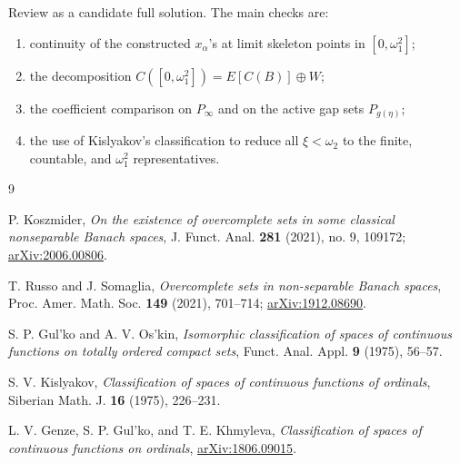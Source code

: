 \documentclass[11pt]{article}
\begin{document}
Review as a candidate full solution.  The main checks are:
\begin{enumerate}[leftmargin=2em]
\item continuity of the constructed \(x_\alpha\)'s at limit skeleton points in
      \([0,\omega_1^2]\);
\item the decomposition \(C([0,\omega_1^2])=E[C(B)]\oplus W\);
\item the coefficient comparison on \(P_\infty\) and on the active gap sets
      \(P_{g(\eta)}\);
\item the use of Kislyakov's classification to reduce all
      \(\xi<\omega_2\) to the finite, countable, and \(\omega_1^2\)
      representatives.
\end{enumerate}

\begin{thebibliography}{9}

P. Koszmider,
\emph{On the existence of overcomplete sets in some classical nonseparable
Banach spaces},
J. Funct. Anal. \textbf{281} (2021), no. 9, 109172;
\href{https://arxiv.org/abs/2006.00806}{arXiv:2006.00806}.

T. Russo and J. Somaglia,
\emph{Overcomplete sets in non-separable Banach spaces},
Proc. Amer. Math. Soc. \textbf{149} (2021), 701--714;
\href{https://arxiv.org/abs/1912.08690}{arXiv:1912.08690}.

S. P. Gul'ko and A. V. Os'kin,
\emph{Isomorphic classification of spaces of continuous functions on totally
ordered compact sets},
Funct. Anal. Appl. \textbf{9} (1975), 56--57.

S. V. Kislyakov,
\emph{Classification of spaces of continuous functions of ordinals},
Siberian Math. J. \textbf{16} (1975), 226--231.

L. V. Genze, S. P. Gul'ko, and T. E. Khmyleva,
\emph{Classification of spaces of continuous functions on ordinals},
\href{https://arxiv.org/abs/1806.09015}{arXiv:1806.09015}.

\end{thebibliography}
\end{document}
